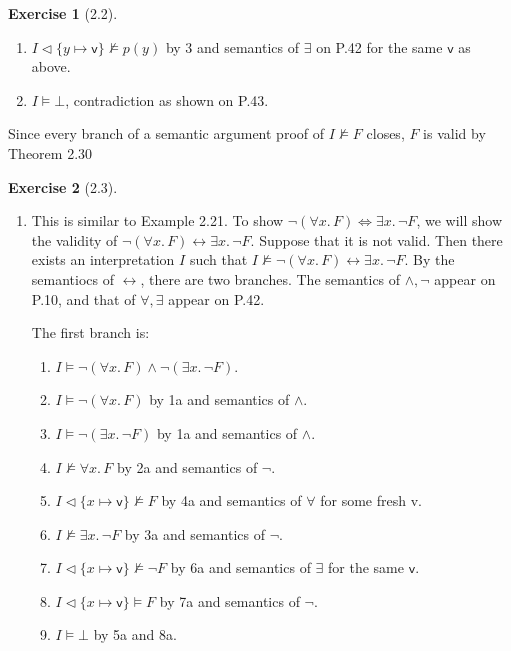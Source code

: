 \documentclass[12pt, psamsfonts]{amsart}
\theoremstyle{definition}
\newtheorem*{exer}{Exercise}
\theoremstyle{remark}
\numberwithin{equation}{subsection}
\begin{document}
\begin{exer}[2.2]
\begin{enumerate}[label=(\alph*)]
\begin{enumerate}[label=\arabic*.]
               \item %
                   $I \vartriangleleft \{ y \mapsto \textsf{v} \} \not\models p(y)$ by 3 and semantics of $\exists$ on P.42 for the same $\textsf{v}$ as above.
               \item %
                   $I \models \bot$, contradiction as shown on P.43.
           \end{enumerate}
           Since every branch of a semantic argument proof of $I \not\models F$ closes, $F$ is valid by Theorem 2.30
    \end{enumerate}
\end{exer}

\begin{exer}[2.3]
    $ $
    \begin{enumerate}[label=(\alph*)]
        \item %
            This is similar to Example 2.21.
            To show $\neg(\forall x.\, F) \Leftrightarrow \exists x.\, \neg F$, we will show the validity of $\neg(\forall x.\, F) \leftrightarrow \exists x.\, \neg F$.
            Suppose that it is not valid.
            Then there exists an interpretation $I$ such that $I \not\models \neg(\forall x.\, F) \leftrightarrow \exists x.\, \neg F$.
            By the semantiocs of $\leftrightarrow$, there are two branches.
            The semantics of $\land, \neg$ appear on P.10, and that of $\forall, \exists$ appear on P.42.

            The first branch is:
            \begin{enumerate}[label=\arabic*a.]
                \item %
                    $I \models \neg(\forall x.\, F) \land \neg(\exists x.\, \neg F)$.
                \item %
                    $I \models \neg(\forall x.\, F)$ by 1a and semantics of $\land$.
                \item %
                    $I \models \neg(\exists x.\, \neg F)$ by 1a and semantics of $\land$.
                \item %
                    $I \not\models \forall x.\, F$ by 2a and semantics of $\neg$.
                \item %
                    $I \vartriangleleft \{ x \mapsto \textsf{v} \} \not\models F$ by 4a and semantics of $\forall$ for some fresh \textsf{v}.
                \item %
                    $I \not \models \exists x.\, \neg F$ by 3a and semantics of $\neg$.
                \item %
                    $I \vartriangleleft \{ x \mapsto \textsf{v} \} \not\models \neg F$ by 6a and semantics of $\exists$ for the same $\textsf{v}$.
                \item %
                    $I \vartriangleleft \{ x \mapsto \textsf{v} \} \models F$ by 7a and semantics of $\neg$.
                \item %
                    $I \models \bot$ by 5a and 8a.
            \end{enumerate}


\end{enumerate}
\end{exer}
\end{document}
